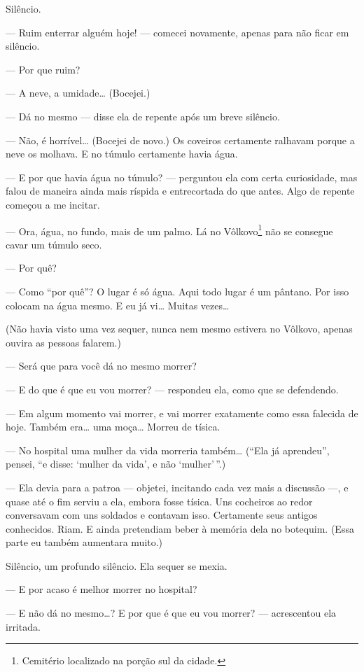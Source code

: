 Silêncio.

--- Ruim enterrar alguém hoje! --- comecei novamente, apenas para não ficar
em silêncio.

--- Por que ruim?

--- A neve, a umidade\ldots{} (Bocejei.)

--- Dá no mesmo --- disse ela de repente após um breve silêncio.

--- Não, é horrível\ldots{} (Bocejei de novo.) Os coveiros certamente ralhavam
porque a neve os molhava. E no túmulo certamente havia água.

--- E por que havia água no túmulo? --- perguntou ela com certa curiosidade,
mas falou de maneira ainda mais ríspida e entrecortada do que antes.
Algo de repente começou a me incitar.

--- Ora, água, no fundo, mais de um palmo. Lá no Vôlkovo\footnote{
Cemitério localizado na porção sul da cidade.} não se consegue cavar um
túmulo seco.

--- Por quê?

--- Como “por quê”? O lugar é só água. Aqui todo lugar é um pântano. Por
isso colocam na água mesmo. E eu já vi\ldots{} Muitas vezes\ldots{}

(Não havia visto uma vez sequer, nunca nem mesmo estivera no Vôlkovo,
apenas ouvira as pessoas falarem.)

--- Será que para você dá no mesmo morrer?

--- E do que é que eu vou morrer? --- respondeu ela, como que se defendendo.

--- Em algum momento vai morrer, e vai morrer exatamente como essa
falecida de hoje. Também era\ldots{} uma moça\ldots{} Morreu de tísica.

--- No hospital uma mulher da vida morreria também\ldots{} (“Ela já aprendeu”,
pensei, “e disse: ‘mulher da vida’, e não ‘mulher’\,”.)

--- Ela devia para a patroa --- objetei, incitando cada vez mais a discussão
---, e quase até o fim serviu a ela, embora fosse tísica. Uns cocheiros
ao redor conversavam com uns soldados e contavam isso. Certamente seus
antigos conhecidos. Riam. E ainda pretendiam beber à memória dela no
botequim. (Essa parte eu também aumentara muito.)

Silêncio, um profundo silêncio. Ela sequer se mexia.

--- E por acaso é melhor morrer no hospital?

--- E não dá no mesmo\ldots{}? E por que é que eu vou morrer? --- acrescentou ela
irritada.

